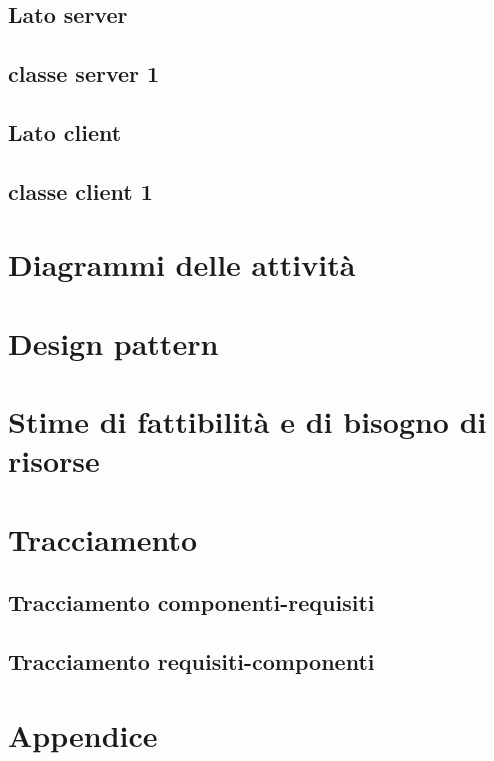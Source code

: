 \documentclass[a4paper]{article}
\begin{document}
		\subsection{Lato server}
			\subsection{classe server 1}
		\subsection{Lato client}
			\subsection{classe client 1}
	\newpage 
	\section{Diagrammi delle attività}
	
	\newpage 
	\section{Design pattern}
	
	\newpage 
	\section{Stime di fattibilità e di bisogno di risorse}
	
	\newpage 
	\section{Tracciamento}
		\subsection{Tracciamento componenti-requisiti}
		\subsection{Tracciamento requisiti-componenti}
		
	\newpage 
	\section{Appendice}
	
	\cleardoublepage
	\listoffigures
	
	\cleardoublepage
	\listoftables
		
\end{document}
